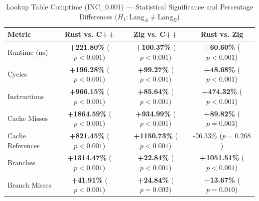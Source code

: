 \begin{table}[htbp]
\centering
\caption{Lookup Table Comptime (INC_0.001) --- Statistical Significance and Percentage Differences ($H_1: \text{Lang}_A \neq \text{Lang}_B$)}
\label{tab:lut_comptime_0_001}
\begin{tabular}{l ccc}
\toprule
\textbf{Metric} & \textbf{Rust vs. C++} & \textbf{Zig vs. C++} & \textbf{Rust vs. Zig} \\
\midrule
Runtime (ns) & \textbf{+221.80\%} ($p < 0.001$) & \textbf{+100.37\%} ($p < 0.001$) & \textbf{+60.60\%} ($p < 0.001$) \\
Cycles & \textbf{+196.28\%} ($p < 0.001$) & \textbf{+99.27\%} ($p < 0.001$) & \textbf{+48.68\%} ($p < 0.001$) \\
Instructions & \textbf{+966.15\%} ($p < 0.001$) & \textbf{+85.64\%} ($p < 0.001$) & \textbf{+474.32\%} ($p < 0.001$) \\
Cache Misses & \textbf{+1864.59\%} ($p < 0.001$) & \textbf{+934.99\%} ($p < 0.001$) & \textbf{+89.82\%} ($p = 0.003$) \\
Cache References & \textbf{+821.45\%} ($p < 0.001$) & \textbf{+1150.73\%} ($p < 0.001$) & -26.33\% ($p = 0.268$) \\
Branches & \textbf{+1314.47\%} ($p < 0.001$) & \textbf{+22.84\%} ($p < 0.001$) & \textbf{+1051.51\%} ($p < 0.001$) \\
Branch Misses & \textbf{+41.91\%} ($p < 0.001$) & \textbf{+24.84\%} ($p = 0.002$) & \textbf{+13.67\%} ($p = 0.010$) \\
\bottomrule
\end{tabular}
\end{table}


